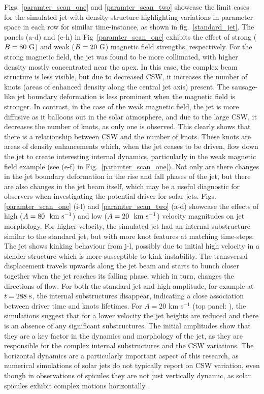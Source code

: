 Figs. \ref{paramter_scan_one} and \ref{paramter_scan_two} showcase the limit cases for the simulated jet with density structure highlighting variations in parameter space in each row for similar time-instance, as shown in fig.~\ref{standard_jet}. The panels (a-d) and (e-h) in Fig~\ref{paramter_scan_one} exhibits the effect of strong ($B = 80~\rm{G}$) and weak ($B = 20~\rm{G}$) magnetic field strengths, respectively. For the strong magnetic field, the jet was found to be more collimated, with higher density mostly concentrated near the apex. In this case, the complex beam structure is less visible, but due to decreased CSW, it increases the number of knots (areas of enhanced density along the central jet axis) present. The sausage-like jet boundary deformation is less prominent when the magnetic field is stronger. In contrast, in the case of the weak magnetic field, the jet is more diffusive as it balloons out in the solar atmosphere, and due to the large CSW, it decreases the number of knots, as only one is observed. This clearly shows that there is a relationship between CSW and the number of knots. These knots are areas of density enhancements which, when the jet ceases to be driven, flow down the jet to create interesting internal dynamics, particularly in the weak magnetic field example (see (e-f) in Fig.~\ref{paramter_scan_one}). Not only are there changes in the jet boundary deformation in the rise and fall phases of the jet, but there are also changes in the jet beam itself, which may be a useful diagnostic for observers when investigating the potential driver for solar jets. \np    
%
Figs. \ref{paramter_scan_one} (i-l) and \ref{paramter_scan_two} (a-d) showcase the effects of high ($A = 80 ~~\rm{km ~s^{-1}}$) and low ($A = 20 ~~\rm{km ~s^{-1}}$) velocity magnitudes on jet morphology. For higher velocity, the simulated jet had an internal substructure similar to the standard jet, but with more knot features at matching time-steps. The jet shows kinking behaviour from j-l, possibly due to initial high velocity in a slender structure which is more susceptible to kink instability. The transversal displacement travels upwards along the jet beam and starts to bunch closer together when the jet reaches its falling phase, which in turn, changes the directions of flow. For both the standard jet and high amplitude, for example at $t = 288 ~\rm{s}$, the internal substructures disappear, indicating a close association between driver time and knots lifetimes. For $A = 20$ km s$^{-1}$ (top panel: ), the simulations suggest that for a lower velocity the jet heights are reduced and there is an absence of any significant substructures. The initial amplitudes show that they are a key factor in the dynamics and morphology of the jet, as they are responsible for the complex internal substructures and the CSW variations. The horizontal dynamics are a particularly important aspect of this research, as numerical simulations of solar jets do not typically report on CSW variation, even though in observations of spicules they are not just vertically dynamic, as solar spicules exhibit complex motions horizontally \citep{Sharma2018ApJ85361S,Antolin2018ApJ85644A}. \np
